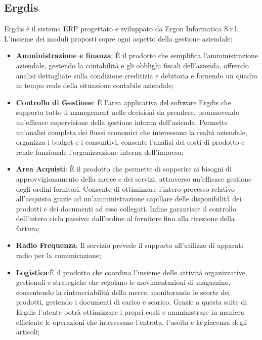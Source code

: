 \pagebreak
\subsection{Ergdis}

Ergdis è il sistema ERP progettato e sviluppato da Ergon Informatica S.r.l.
L'insieme dei moduli proposti copre ogni aspetto della gestione aziendale:

\begin{itemize}
	\item \textbf{Amministrazione e finanza}: È il prodotto che semplifica l’amministrazione aziendale, gestendo la contabilità e gli obblighi fiscali dell’azienda,
	 offrendo analisi dettagliate sulla condizione creditizia e debitoria e fornendo un quadro in tempo reale della situazione contabile aziendale;
	
	\item \textbf{Controllo di Gestione}: È l’area applicativa del software Ergdis che supporta tutto il management nelle decisioni da prendere,
	 promuovendo un’efficace supervisione della gestione interna dell’azienda. Permette un’analisi completa dei flussi economici che interessano la realtà aziendale,
	  organizza i budget e i consuntivi, consente l’analisi dei costi di prodotto e rende funzionale l’organizzazione interna dell’impresa;
	
	\item \textbf{Area Acquisti}: È il prodotto che permette di sopperire ai bisogni di approvvigionamento della merce e dei servizi, 
	attraverso un’efficace gestione degli ordini fornitori. Consente di ottimizzare l'intero processo relativo all’acquisto grazie ad un’amministrazione capillare 
	delle disponibilità dei prodotti e dei documenti ad esso collegati. Infine garantisce il controllo dell’intero ciclo passivo: dall’ordine al fornitore fino alla
	ricezione della fattura;
	
	\item \textbf{Radio Frequenza}: Il servizio prevede il supporto all'utilizzo di apparati radio per la comunicazione;
	
	\item \textbf{Logistica}:È il prodotto che coordina l’insieme delle attività organizzative, gestionali e strategiche che regolano le movimentazioni di magazzino, 
	consentendo la rintracciabilità della merce, monitorando le scorte dei prodotti, gestendo i documenti di carico e scarico. Grazie a questa suite di Ergdis l’utente 
	potrà ottimizzare i propri costi e amministrare in maniera efficiente le operazioni che interessano l’entrata, l’uscita e la giacenza degli articoli;
	

\end{itemize}
